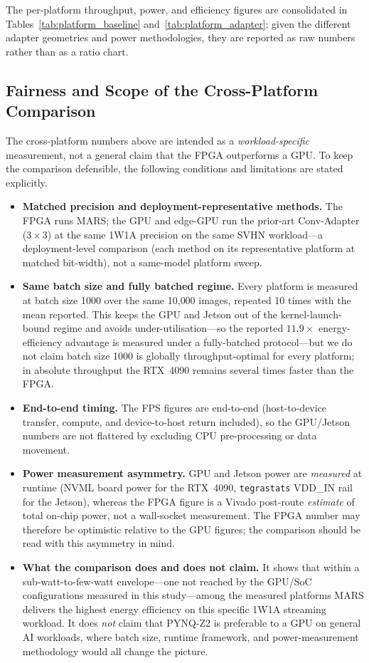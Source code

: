\documentclass[12pt, a4paper]{report}
\numberwithin{equation}{chapter}
\numberwithin{figure}{chapter}
\numberwithin{table}{chapter}
\numberwithin{algorithm}{chapter}
\begin{document}
The per-platform throughput, power, and efficiency figures are consolidated in Tables~\ref{tab:platform_baseline} and~\ref{tab:platform_adapter}; given the different adapter geometries and power methodologies, they are reported as raw numbers rather than as a ratio chart.



\subsection{Fairness and Scope of the Cross-Platform Comparison}
\label{sec:cross_platform_fairness}

The cross-platform numbers above are intended as a \emph{workload-specific} measurement, not a general claim that the FPGA outperforms a GPU. To keep the comparison defensible, the following conditions and limitations are stated explicitly.

\begin{itemize}
    \item \textbf{Matched precision and deployment-representative methods.} The FPGA runs MARS; the GPU and edge-GPU run the prior-art Conv-Adapter ($3\times3$) at the same 1W1A precision on the same SVHN workload---a deployment-level comparison (each method on its representative platform at matched bit-width), not a same-model platform sweep.
    \item \textbf{Same batch size and fully batched regime.} Every platform is measured at batch size 1000 over the same 10{,}000 images, repeated 10 times with the mean reported. This keeps the GPU and Jetson out of the kernel-launch-bound regime and avoids under-utilisation---so the reported $11.9\times$ energy-efficiency advantage is measured under a fully-batched protocol---but we do not claim batch size 1000 is globally throughput-optimal for every platform; in absolute throughput the RTX~4090 remains several times faster than the FPGA.
    \item \textbf{End-to-end timing.} The FPS figures are end-to-end (host-to-device transfer, compute, and device-to-host return included), so the GPU/Jetson numbers are not flattered by excluding CPU pre-processing or data movement.
    \item \textbf{Power measurement asymmetry.} GPU and Jetson power are \emph{measured} at runtime (NVML board power for the RTX~4090, \texttt{tegrastats} VDD\_IN rail for the Jetson), whereas the FPGA figure is a Vivado post-route \emph{estimate} of total on-chip power, not a wall-socket measurement. The FPGA number may therefore be optimistic relative to the GPU figures; the comparison should be read with this asymmetry in mind.
    \item \textbf{What the comparison does and does not claim.} It shows that within a sub-watt-to-few-watt envelope---one not reached by the GPU/SoC configurations measured in this study---among the measured platforms MARS delivers the highest energy efficiency on this specific 1W1A streaming workload. It does \emph{not} claim that PYNQ-Z2 is preferable to a GPU on general AI workloads, where batch size, runtime framework, and power-measurement methodology would all change the picture.
\end{itemize}
\end{document}
